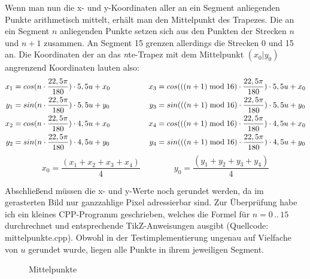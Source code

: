 Wenn man nun die x- und y-Koordinaten aller an ein Segment anliegenden Punkte arithmetisch mittelt, erhält man den Mittelpunkt des Trapezes. Die an ein Segment \(n\) anliegenden Punkte setzen sich aus den Punkten der Strecken \(n\) und \(n+1\) zusammen. An Segment 15 grenzen allerdings die Strecken 0 und 15 an. 
Die Koordinaten der an das \textit{n}te-Trapez mit dem Mittelpunkt \((x_0|y_0)\) angrenzend Koordinaten lauten also:
\begin{gather}
	\begin{split}
		x_1 &= cos(n \cdot \frac{22,5\pi}{180}) \cdot 5,5u + x_0\\
		y_1 &= sin(n \cdot \frac{22,5\pi}{180}) \cdot 5,5u + y_0\\ \vspace{2em}
		x_2 &= cos(n \cdot \frac{22,5\pi}{180}) \cdot 4,5u + x_0\\
		y_2 &= sin(n \cdot \frac{22,5\pi}{180}) \cdot 4,5u + y_0
	\end{split}
	\hspace{5em}
	\begin{split}
		x_3 &= cos(((n+1)\bmod{}16) \cdot \frac{22,5\pi}{180}) \cdot 5,5u + x_0\\
		y_3 &= sin(((n+1)\bmod{}16) \cdot \frac{22,5\pi}{180}) \cdot 5,5u + y_0 \\ \vspace{2em}
		x_4 &= cos(((n+1)\bmod{}16) \cdot \frac{22,5\pi}{180}) \cdot 4,5u + x_0\\
		y_4 &= sin(((n+1)\bmod{}16) \cdot \frac{22,5\pi}{180}) \cdot 4,5u + y_0
	\end{split} \label{eq:nKoords}
\end{gather}
\begin{equation}
	x_0 = \frac{(x_1+x_2+x_3+x_4)}{4} \hspace{4em} y_0 = \frac{(y_1+y_2+y_3+y_4)}{4}
\end{equation}

Abschließend müssen die x- und y-Werte noch gerundet werden, da im gerasterten Bild nur ganzzahlige Pixel adressierbar sind.
Zur Überprüfung habe ich ein kleines CPP-Programm geschrieben, welches die Formel für \(n = 0\hspace{2pt}..\hspace{2pt}15 \) durchrechnet und entsprechende TikZ-Anweisungen ausgibt (Quellcode: mittelpunkte.cpp). Obwohl in der Testimplementierung ungenau auf Vielfache von \(u\) gerundet wurde, liegen alle Punkte in ihrem jeweiligen Segment.

\begin{figure}[!ht]
	\centering
	
	\caption{Mittelpunkte}
\end{figure}

